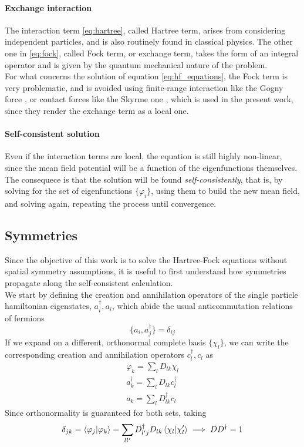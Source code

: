 \paragraph{Exchange interaction}
The interaction term \ref{eq:hartree}, called Hartree term, arises from considering independent particles, and is also routinely found in classical physics. The other one in \ref{eq:fock}, called Fock term, or exchange term, takes the form of an integral operator and is given by the quantum mechanical nature of the problem.
\\For what concerns the solution of equation \ref{eq:hf_equations}, the Fock term is very problematic, and is avoided using finite-range interaction like the Gogny force \cite{Robledo_2019}, or contact forces like the Skyrme one \cite{SKYRME1958615}, which is used in the present work, since they render the exchange term as a local one.
\paragraph{Self-consistent solution}
Even if the interaction terms are local, the equation is still highly non-linear, since the mean field potential will be a function of the eigenfunctions themselves. The consequece is that the solution will be found \textit{self-consistently}, that is, by solving for the set of eigenfunctions $\{\varphi_i\}$, using them to build the new mean field, and solving again, repeating the process until convergence.
\subsection{Symmetries}
Since the objective of this work is to solve the Hartree-Fock equations without spatial symmetry assumptions, it is useful to first understand how symmetries propagate along the self-consistent calculation.
\\We start by defining the creation and annihilation operators of the single particle hamiltonian eigenstates, $a_i^\dagger, a_i$, which abide the usual anticommutation relations of fermions
\begin{equation}
    \label{eq:fermion_anticommutations}
    \{a_i, a_j^\dagger\} = \delta_{ij}
\end{equation}
If we expand on a different, orthonormal complete basis $\{\chi_l\}$, we can write the corresponding creation and annihilation operators $c_l^\dagger, c_l$ as
\begin{align}
    \label{eq:basis_change}
    \varphi_k = \sum_l D_{lk} \chi_l\\
    a_k^\dagger = \sum_l D_{lk} c_l^\dagger\\
    a_k = \sum_l D_{lk}^\dagger c_l
\end{align}
Since orthonormality is guaranteed for both sets, taking 
\begin{equation}
    \delta_{jk} = \bra{\varphi_j}\ket{\varphi_k} = \sum_{ll'} D_{l'j}^\dagger D_{lk}\bra{\chi_l}\ket{\chi_l'}\implies DD^\dagger = 1
\end{equation}
